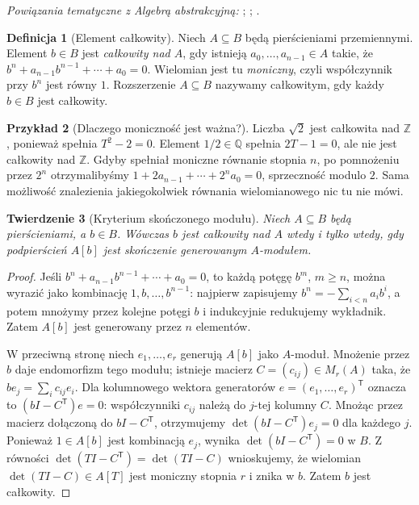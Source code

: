 \documentclass[11pt,a4paper,openany]{report}
\numberwithin{equation}{section}
\theoremstyle{plain}
\newtheorem{twierdzenie}{Twierdzenie}[section]
\theoremstyle{definition}
\newtheorem{definicja}[twierdzenie]{Definicja}
\newtheorem{przyklad}[twierdzenie]{Przykład}
\theoremstyle{remark}
\newcommand{\Z}{\mathbb Z}
\newcommand{\Q}{\mathbb Q}
\begin{document}
\noindent\emph{Powiązania tematyczne z Algebrą abstrakcyjną:} ; ; .

\begin{definicja}[Element całkowity]
Niech $A\subseteq B$ będą pierścieniami przemiennymi.
Element $b\in B$ jest \emph{całkowity nad $A$},
gdy istnieją $a_0,\ldots,a_{n-1}\in A$ takie, że
$b^n+a_{n-1}b^{n-1}+\cdots+a_0=0$.
Wielomian jest tu \emph{moniczny}, czyli współczynnik
przy $b^n$ jest równy $1$. Rozszerzenie $A\subseteq B$
nazywamy całkowitym, gdy każdy $b\in B$ jest całkowity.
\end{definicja}

\begin{przyklad}[Dlaczego moniczność jest ważna?]
Liczba $\sqrt2$ jest całkowita nad $\Z$, ponieważ
spełnia $T^2-2=0$. Element $1/2\in\Q$ spełnia
$2T-1=0$, ale nie jest całkowity nad $\Z$.
Gdyby spełniał moniczne równanie stopnia $n$,
po pomnożeniu przez $2^n$ otrzymalibyśmy
$1+2a_{n-1}+\cdots+2^na_0=0$, sprzeczność
modulo $2$. Sama możliwość znalezienia jakiegokolwiek
równania wielomianowego nic tu nie mówi.
\end{przyklad}

\begin{twierdzenie}[Kryterium skończonego modułu]
\label{tw:integrality-module}
Niech $A\subseteq B$ będą pierścieniami, a $b\in B$.
Wówczas $b$ jest całkowity nad $A$ wtedy i tylko wtedy,
gdy podpierścień $A[b]$ jest skończenie generowanym
$A$-modułem.
\end{twierdzenie}
\begin{proof}
Jeśli $b^n+a_{n-1}b^{n-1}+\cdots+a_0=0$,
to każdą potęgę $b^m$, $m\ge n$, można wyrazić
jako kombinację $1,b,\ldots,b^{n-1}$: najpierw
zapisujemy $b^n=-\sum_{i<n}a_ib^i$,
a potem mnożymy przez kolejne potęgi $b$ i
indukcyjnie redukujemy wykładnik. Zatem
$A[b]$ jest generowany przez $n$ elementów.

W przeciwną stronę niech $e_1,\ldots,e_r$ generują
$A[b]$ jako $A$-moduł. Mnożenie przez $b$
daje endomorfizm tego modułu; istnieje macierz
$C=(c_{ij})\in M_r(A)$ taka, że
$b e_j=\sum_i c_{ij}e_i$. Dla kolumnowego
wektora generatorów $e=(e_1,\ldots,e_r)^{\mathsf T}$
oznacza to $(bI-C^{\mathsf T})e=0$:
współczynniki $c_{ij}$ należą do $j$-tej kolumny $C$.
Mnożąc przez macierz dołączoną do $bI-C^{\mathsf T}$,
otrzymujemy $\det(bI-C^{\mathsf T})e_j=0$
dla każdego $j$. Ponieważ $1\in A[b]$ jest
kombinacją $e_j$, wynika
$\det(bI-C^{\mathsf T})=0$ w $B$.
Z równości $\det(TI-C^{\mathsf T})=\det(TI-C)$
wnioskujemy, że wielomian
$\det(TI-C)\in A[T]$ jest moniczny stopnia $r$
i znika w $b$. Zatem $b$ jest całkowity.
\end{proof}
\end{document}
